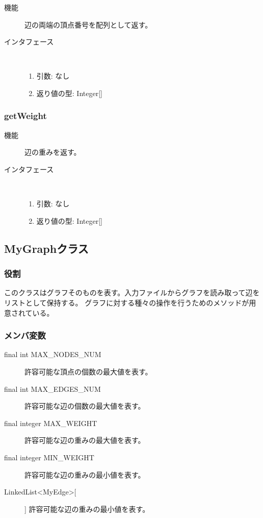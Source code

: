 \documentclass[a4j]{jarticle}
\begin{document}
\begin{description}
\item[機能]
辺の両端の頂点番号を配列として返す。

\item[インタフェース]\ \vspace{0mm}
\begin{enumerate}
  \item 引数: なし
  \item 返り値の型: Integer[]
\end{enumerate}
\end{description}

\subsubsection{getWeight}

\begin{description}
\item[機能]
辺の重みを返す。

\item[インタフェース]\ \vspace{0mm}
\begin{enumerate}
  \item 引数: なし
  \item 返り値の型: Integer[]
\end{enumerate}
\end{description}

\subsection{MyGraphクラス}

\subsubsection{役割}
このクラスはグラフそのものを表す。入力ファイルからグラフを読み取って辺をリストとして保持する。
グラフに対する種々の操作を行うためのメソッドが用意されている。

\subsubsection{メンバ変数}

\begin{description}
\item[final int MAX\_NODES\_NUM]
許容可能な頂点の個数の最大値を表す。

\item[final int MAX\_EDGES\_NUM]
許容可能な辺の個数の最大値を表す。

\item[final integer MAX\_WEIGHT]
許容可能な辺の重みの最大値を表す。

\item[final integer MIN\_WEIGHT]
許容可能な辺の重みの最小値を表す。

\item[LinkedList\textless MyEdge\textgreater[] ]
許容可能な辺の重みの最小値を表す。

\end{description}
\end{document}
